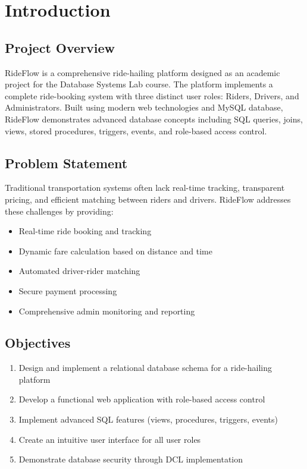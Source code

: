 \documentclass[12pt,a4paper]{report}
\begin{document}
\tableofcontents
\newpage

\listoffigures
\newpage

\listoftables
\newpage

\chapter{Introduction}

\section{Project Overview}
RideFlow is a comprehensive ride-hailing platform designed as an academic project for the Database Systems Lab course. The platform implements a complete ride-booking system with three distinct user roles: Riders, Drivers, and Administrators. Built using modern web technologies and MySQL database, RideFlow demonstrates advanced database concepts including SQL queries, joins, views, stored procedures, triggers, events, and role-based access control.

\section{Problem Statement}
Traditional transportation systems often lack real-time tracking, transparent pricing, and efficient matching between riders and drivers. RideFlow addresses these challenges by providing:
\begin{itemize}
    \item Real-time ride booking and tracking
    \item Dynamic fare calculation based on distance and time
    \item Automated driver-rider matching
    \item Secure payment processing
    \item Comprehensive admin monitoring and reporting
\end{itemize}

\section{Objectives}
\begin{enumerate}
    \item Design and implement a relational database schema for a ride-hailing platform
    \item Develop a functional web application with role-based access control
    \item Implement advanced SQL features (views, procedures, triggers, events)
    \item Create an intuitive user interface for all user roles
    \item Demonstrate database security through DCL implementation
\end{enumerate}
\end{document}
